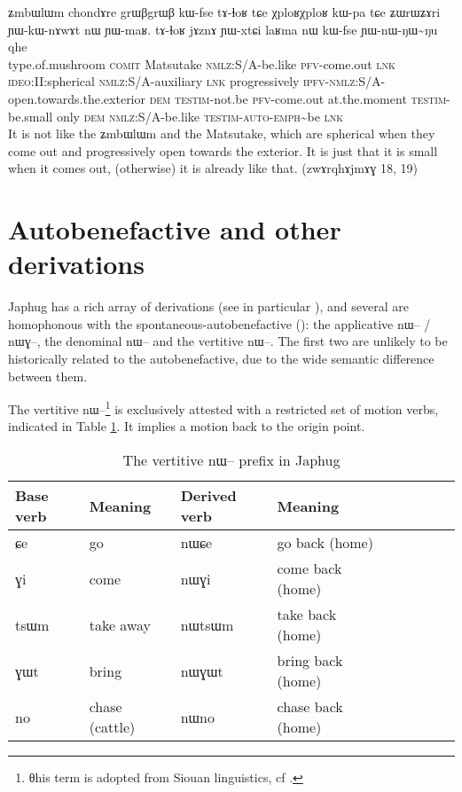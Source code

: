 \documentclass[oldfontcommands,oneside,a4paper,11pt]{article}
\newcommand{\ipa}[1]{{\phon \mbox{#1}}} %
\begin{document}
\begin{exe}
 \ex \label{ex:YWnWNWNu}
 \gll
\ipa{ʑmbɯlɯm}	\ipa{chondɤre}  	\ipa{grɯβgrɯβ}  	\ipa{kɯ-fse}  	\ipa{tɤ-ɬoʁ}  	\ipa{tɕe}  	\ipa{χploʁχploʁ}  	\ipa{kɯ-pa}  
\ipa{tɕe}  	\ipa{ʑɯrɯʑɤri}  	\ipa{ɲɯ-kɯ-nɤwɤt}  	\ipa{nɯ}  	\ipa{ɲɯ-maʁ.}  
\ipa{tɤ-ɬoʁ}  	\ipa{jɤznɤ}  	\ipa{ɲɯ-xtɕi}  	\ipa{laʁma}  	\ipa{nɯ}  	\ipa{kɯ-fse}  	\ipa{ɲɯ-nɯ-ŋɯ\textasciitilde{}ŋu}  	\ipa{qhe}  	\\
type.of.mushroom \textsc{comit} Matsutake \textsc{nmlz}:S/A-be.like \textsc{pfv}-come.out \textsc{lnk} \textsc{ideo:II:}spherical \textsc{nmlz}:S/A-auxiliary \textsc{lnk} progressively \textsc{ipfv}-\textsc{nmlz}:S/A-open.towards.the.exterior \textsc{dem} \textsc{testim}-not.be  \textsc{pfv}-come.out at.the.moment \textsc{testim}-be.small only \textsc{dem} \textsc{nmlz}:S/A-be.like \textsc{testim-auto}-\textsc{emph}\textasciitilde{}be \textsc{lnk} \\
\glt It is not like the \ipa{ʑmbɯlɯm} and the Matsutake, which are spherical when they come out and progressively open towards the exterior. It is just that it is small when it comes out, (otherwise) it is already like that.
 (\ipa{zwɤrqhɤjmɤɣ} 18, 19)
 \end{exe}


\section{Autobenefactive and other derivations}

Japhug has a rich array of derivations (see in particular \citealt{jacques14antipassive}), and several are homophonous with the spontaneous-autobenefactive (\citealt{jacques13tropative}): the applicative \ipa{nɯ--} / \ipa{nɯɣ--}, the denominal \ipa{nɯ--} and the vertitive \ipa{nɯ--}. The first two are unlikely to be historically related to the autobenefactive, due to the wide semantic difference between them.

The vertitive \ipa{nɯ--}\footnote{θhis term is adopted from Siouan linguistics, cf \citet{taylor76motion}.} is exclusively attested with a restricted set of motion verbs, indicated in Table \ref{tab:vertitive}. It implies a motion back to the origin point.
 
\begin{table}
\caption{The vertitive \ipa{nɯ--} prefix in Japhug} \centering \label{tab:vertitive}
\begin{tabular}{lllllllll}
\toprule
Base verb & Meaning & Derived verb & Meaning& \\
\midrule
\ipa{ɕe} & go & \ipa{nɯɕe} & go back (home) & \\
\ipa{ɣi} & come & \ipa{nɯɣi} & come back (home)& \\
\ipa{tsɯm} & take away & \ipa{nɯtsɯm} & take back  (home)& \\
\ipa{ɣɯt} & bring & \ipa{nɯɣɯt} & bring back  (home)& \\
\ipa{no} & chase (cattle) & \ipa{nɯno} & chase back  (home)& \\
\bottomrule
\end{tabular}
\end{table}
\end{document}
